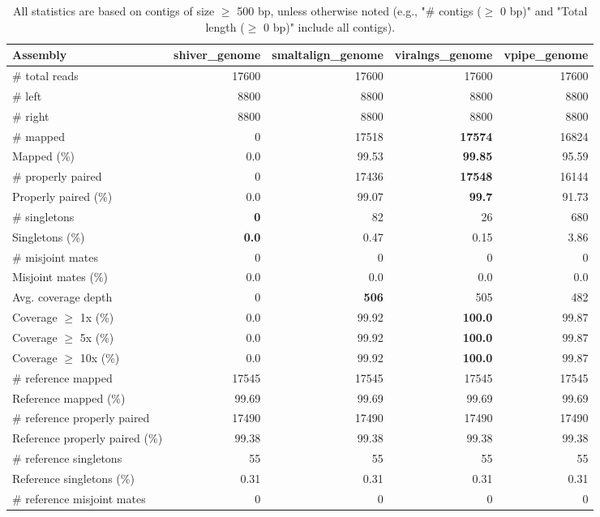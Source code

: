 \documentclass[12pt,a4paper]{article}
\begin{document}
\begin{table}[ht]
\begin{center}
\caption{All statistics are based on contigs of size $\geq$ 500 bp, unless otherwise noted (e.g., "\# contigs ($\geq$ 0 bp)" and "Total length ($\geq$ 0 bp)" include all contigs).}
\begin{tabular}{|l*{4}{|r}|}
\hline
Assembly & shiver\_genome & smaltalign\_genome & viralngs\_genome & vpipe\_genome \\ \hline
\# total reads & 17600 & 17600 & 17600 & 17600 \\ \hline
\# left & 8800 & 8800 & 8800 & 8800 \\ \hline
\# right & 8800 & 8800 & 8800 & 8800 \\ \hline
\# mapped & 0 & 17518 & {\bf 17574} & 16824 \\ \hline
Mapped (\%) & 0.0 & 99.53 & {\bf 99.85} & 95.59 \\ \hline
\# properly paired & 0 & 17436 & {\bf 17548} & 16144 \\ \hline
Properly paired (\%) & 0.0 & 99.07 & {\bf 99.7} & 91.73 \\ \hline
\# singletons & {\bf 0} & 82 & 26 & 680 \\ \hline
Singletons (\%) & {\bf 0.0} & 0.47 & 0.15 & 3.86 \\ \hline
\# misjoint mates & 0 & 0 & 0 & 0 \\ \hline
Misjoint mates (\%) & 0.0 & 0.0 & 0.0 & 0.0 \\ \hline
Avg. coverage depth & 0 & {\bf 506} & 505 & 482 \\ \hline
Coverage $\geq$ 1x (\%) & 0.0 & 99.92 & {\bf 100.0} & 99.87 \\ \hline
Coverage $\geq$ 5x (\%) & 0.0 & 99.92 & {\bf 100.0} & 99.87 \\ \hline
Coverage $\geq$ 10x (\%) & 0.0 & 99.92 & {\bf 100.0} & 99.87 \\ \hline
\# reference mapped & 17545 & 17545 & 17545 & 17545 \\ \hline
Reference mapped (\%) & 99.69 & 99.69 & 99.69 & 99.69 \\ \hline
\# reference properly paired & 17490 & 17490 & 17490 & 17490 \\ \hline
Reference properly paired (\%) & 99.38 & 99.38 & 99.38 & 99.38 \\ \hline
\# reference singletons & 55 & 55 & 55 & 55 \\ \hline
Reference singletons (\%) & 0.31 & 0.31 & 0.31 & 0.31 \\ \hline
\# reference misjoint mates & 0 & 0 & 0 & 0 \\ \hline

\end{tabular}
\end{center}
\end{table}
\end{document}
